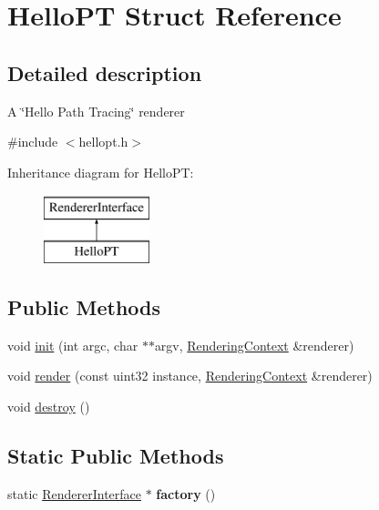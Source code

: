 \hypertarget{struct_hello_p_t}{}\section{Hello\+PT Struct Reference}
\label{struct_hello_p_t}


\subsection{Detailed description}
A \char`\"{}\+Hello Path Tracing\char`\"{} renderer 

{\ttfamily \#include $<$hellopt.\+h$>$}

Inheritance diagram for Hello\+PT\+:\begin{figure}[H]
\begin{center}
\leavevmode
\includegraphics[height=2.000000cm]{struct_hello_p_t}
\end{center}
\end{figure}
\subsection*{Public Methods}
\begin{DoxyCompactItemize}
\item 
void \hyperlink{struct_hello_p_t_a8ec59e3fac8eff801cecdd3220cd8d41}{init} (int argc, char $\ast$$\ast$argv, \hyperlink{struct_rendering_context}{Rendering\+Context} \&renderer)
\item 
void \hyperlink{struct_hello_p_t_af772aac0d80118742450fd8b6b3c58c2}{render} (const uint32 instance, \hyperlink{struct_rendering_context}{Rendering\+Context} \&renderer)
\item 
void \hyperlink{struct_hello_p_t_ac81e09dcfb28dffc85aa6c4df06a4426}{destroy} ()
\end{DoxyCompactItemize}
\subsection*{Static Public Methods}
\begin{DoxyCompactItemize}
\item 
\mbox{\label{struct_hello_p_t_a347a1e63590b2e1dc84f8ef601a3574b}} 
static \hyperlink{struct_renderer_interface}{Renderer\+Interface} $\ast$ {\bfseries factory} ()
\end{DoxyCompactItemize}
